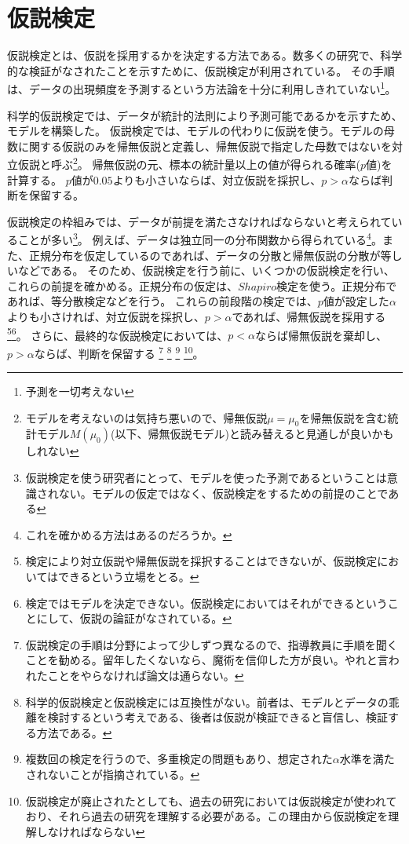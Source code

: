 \chapter{仮説検定}
仮説検定とは、仮説を採用するかを決定する方法である。数多くの研究で、科学的な検証がなされたことを示すために、仮説検定が利用されている。
その手順は、データの出現頻度を予測するという方法論を十分に利用しきれていない\footnote{予測を一切考えない}。


科学的仮説検定では、データが統計的法則により予測可能であるかを示すため、モデルを構築した。
仮説検定では、モデルの代わりに仮説を使う。モデルの母数に関する仮説のみを帰無仮説と定義し、帰無仮説で指定した母数ではないを対立仮説と呼ぶ\footnote{モデルを考えないのは気持ち悪いので、帰無仮説$\mu=\mu_0$を帰無仮説を含む統計モデル$M(\mu_0)$(以下、帰無仮説モデル)と読み替えると見通しが良いかもしれない}。
帰無仮説の元、標本の統計量以上の値が得られる確率($p$値)を計算する。
$p$値が$0.05$よりも小さいならば、対立仮説を採択し、$p>\alpha$ならば判断を保留する。

仮説検定の枠組みでは、データが前提を満たさなければならないと考えられていることが多い\footnote{仮説検定を使う研究者にとって、モデルを使った予測であるということは意識されない。モデルの仮定ではなく、仮説検定をするための前提のことである}。
例えば、データは独立同一の分布関数から得られている\footnote{これを確かめる方法はあるのだろうか。}。また、正規分布を仮定しているのであれば、データの分散と帰無仮説の分散が等しいなどである。
そのため、仮説検定を行う前に、いくつかの仮説検定を行い、これらの前提を確かめる。正規分布の仮定は、$Shapiro$検定を使う。正規分布であれば、等分散検定などを行う。
これらの前段階の検定では、$p$値が設定した$\alpha$よりも小さければ、対立仮説を採択し、$p>\alpha$であれば、帰無仮説を採用する\footnote{検定により対立仮説や帰無仮説を採択することはできないが、仮説検定においてはできるという立場をとる。}\footnote{検定ではモデルを決定できない。仮説検定においてはそれができるということにして、仮説の論証がなされている。}。
さらに、最終的な仮説検定においては、$p<\alpha$ならば帰無仮説を棄却し、$p>\alpha$ならば、判断を保留する
\footnote{仮説検定の手順は分野によって少しずつ異なるので、指導教員に手順を聞くことを勧める。留年したくないなら、魔術を信仰した方が良い。やれと言われたことをやらなければ論文は通らない。}
\footnote{科学的仮説検定と仮説検定には互換性がない。前者は、モデルとデータの乖離を検討するという考えである、後者は仮説が検証できると盲信し、検証する方法である。}
\footnote{複数回の検定を行うので、多重検定の問題もあり、想定された$\alpha$水準を満たされないことが指摘されている。}
\footnote{仮説検定が廃止されたとしても、過去の研究においては仮説検定が使われており、それら過去の研究を理解する必要がある。この理由から仮説検定を理解しなければならない}。

